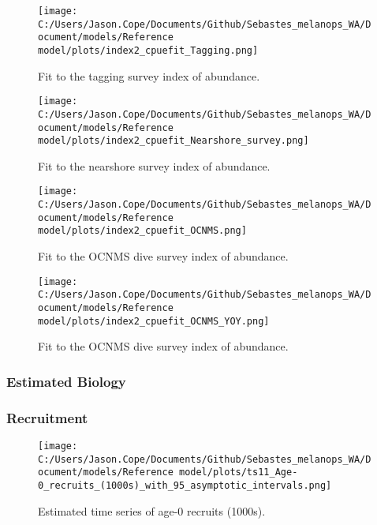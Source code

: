 \documentclass[11pt,
  english,
  letterpaper,
]{article}
\begin{document}
\pagebreak

\begin{figure}
\centering
\texttt{[image: C:/Users/Jason.Cope/Documents/Github/Sebastes\_melanops\_WA/Document/models/Reference model/plots/index2\_cpuefit\_Tagging.png]}
\caption{Fit to the tagging survey index of abundance.\label{fig:tag-index-fit}}
\end{figure}

\pagebreak

\begin{figure}
\centering
\texttt{[image: C:/Users/Jason.Cope/Documents/Github/Sebastes\_melanops\_WA/Document/models/Reference model/plots/index2\_cpuefit\_Nearshore\_survey.png]}
\caption{Fit to the nearshore survey index of abundance.\label{fig:nearshore-index-fit}}
\end{figure}

\pagebreak

\begin{figure}
\centering
\texttt{[image: C:/Users/Jason.Cope/Documents/Github/Sebastes\_melanops\_WA/Document/models/Reference model/plots/index2\_cpuefit\_OCNMS.png]}
\caption{Fit to the OCNMS dive survey index of abundance.\label{fig:ocnms-index-fit}}
\end{figure}

\pagebreak

\begin{figure}
\centering
\texttt{[image: C:/Users/Jason.Cope/Documents/Github/Sebastes\_melanops\_WA/Document/models/Reference model/plots/index2\_cpuefit\_OCNMS\_YOY.png]}
\caption{Fit to the OCNMS dive survey index of abundance.\label{fig:ocnms-yoy-index-fit}}
\end{figure}

\pagebreak

\hypertarget{estimated-biology}{%
\subsubsection{Estimated Biology}\label{estimated-biology}}

\hypertarget{recruitment-1}{%
\subsubsection{Recruitment}\label{recruitment-1}}

\begin{figure}
\centering
\texttt{[image: C:/Users/Jason.Cope/Documents/Github/Sebastes\_melanops\_WA/Document/models/Reference model/plots/ts11\_Age-0\_recruits\_(1000s)\_with\_95\_asymptotic\_intervals.png]}
\caption{Estimated time series of age-0 recruits (1000s).\label{fig:recruits}}
\end{figure}
\end{document}
